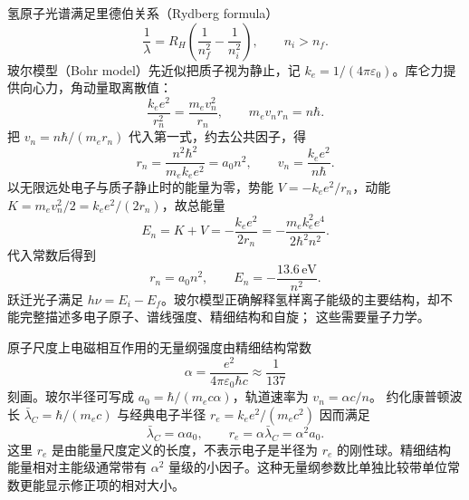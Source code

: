 氢原子光谱满足里德伯关系（Rydberg formula）
\begin{equation}
 \frac1\lambda=R_H\left(\frac1{n_f^2}-\frac1{n_i^2}\right),
 \qquad n_i>n_f.
\end{equation}
玻尔模型（Bohr model）先近似把质子视为静止，记 $k_e=1/(4\pi\varepsilon_0)$。库仑力提供向心力，角动量取离散值：
\[
 \frac{k_ee^2}{r_n^2}=\frac{m_ev_n^2}{r_n},\qquad m_ev_nr_n=n\hbar.
\]
把 $v_n=n\hbar/(m_er_n)$ 代入第一式，约去公共因子，得
\[
 r_n=\frac{n^2\hbar^2}{m_ek_ee^2}=a_0n^2,\qquad v_n=\frac{k_ee^2}{n\hbar}.
\]
以无限远处电子与质子静止时的能量为零，势能 $V=-k_ee^2/r_n$，动能 $K=m_ev_n^2/2=k_ee^2/(2r_n)$，故总能量
\[
 E_n=K+V=-\frac{k_ee^2}{2r_n}=-\frac{m_ek_e^2e^4}{2\hbar^2n^2}.
\]
代入常数后得到
\begin{equation}
 r_n=a_0n^2,\qquad E_n=-\frac{13.6\,\mathrm{eV}}{n^2}.
\end{equation}
跃迁光子满足 $h\nu=E_i-E_f$。玻尔模型正确解释氢样离子能级的主要结构，却不能完整描述多电子原子、谱线强度、精细结构和自旋；
这些需要量子力学。

原子尺度上电磁相互作用的无量纲强度由精细结构常数
\begin{equation}
 \alpha=\frac{e^2}{4\pi\varepsilon_0\hbar c}\approx\frac1{137}
\end{equation}
刻画。玻尔半径可写成 $a_0=\hbar/(m_ec\alpha)$，轨道速率为 $v_n=\alpha c/n$。
约化康普顿波长 $\bar\lambda_C=\hbar/(m_ec)$ 与经典电子半径 $r_e=k_ee^2/(m_ec^2)$ 因而满足
\[
 \bar\lambda_C=\alpha a_0,\qquad r_e=\alpha\bar\lambda_C=\alpha^2a_0.
\]
这里 $r_e$ 是由能量尺度定义的长度，不表示电子是半径为 $r_e$ 的刚性球。精细结构能量相对主能级通常带有 $\alpha^2$ 量级的小因子。这种无量纲参数比单独比较带单位常数更能显示修正项的相对大小。

